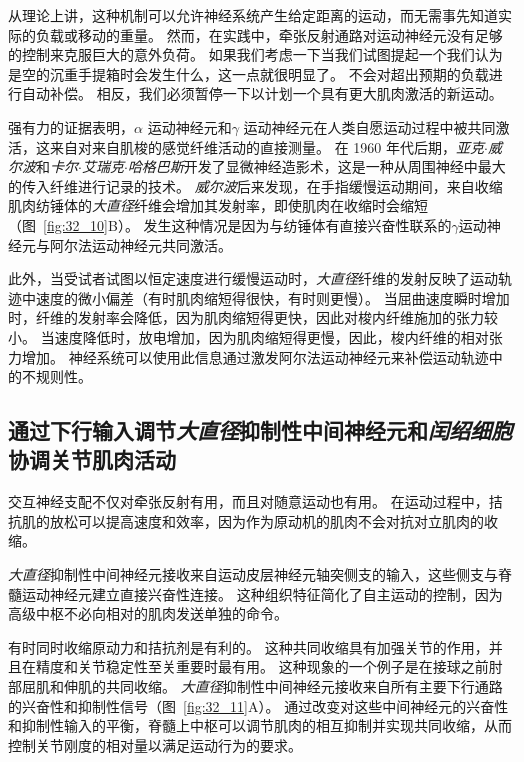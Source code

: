 从理论上讲，这种机制可以允许神经系统产生给定距离的运动，而无需事先知道实际的负载或移动的重量。
然而，在实践中，牵张反射通路对运动神经元没有足够的控制来克服巨大的意外负荷。
如果我们考虑一下当我们试图提起一个我们认为是空的沉重手提箱时会发生什么，这一点就很明显了。
不会对超出预期的负载进行自动补偿。
相反，我们必须暂停一下以计划一个具有更大肌肉激活的新运动。


强有力的证据表明，$ \alpha $ 运动神经元和$ \gamma $ 运动神经元在人类自愿运动过程中被共同激活，这来自对来自肌梭的感觉纤维活动的直接测量。
在 1960 年代后期，\textit{亚克$\cdot$威尔波}和\textit{卡尔$\cdot$艾瑞克$\cdot$哈格巴斯}开发了显微神经造影术，这是一种从周围神经中最大的传入纤维进行记录的技术。
\textit{威尔波}后来发现，在手指缓慢运动期间，来自收缩肌肉纺锤体的\textit{大直径}纤维会增加其发射率，即使肌肉在收缩时会缩短（图~\ref{fig:32_10}B）。
发生这种情况是因为与纺锤体有直接兴奋性联系的$ \gamma $运动神经元与阿尔法运动神经元共同激活。


此外，当受试者试图以恒定速度进行缓慢运动时，\textit{大直径}纤维的发射反映了运动轨迹中速度的微小偏差（有时肌肉缩短得很快，有时则更慢）。
当屈曲速度瞬时增加时，纤维的发射率会降低，因为肌肉缩短得更快，因此对梭内纤维施加的张力较小。
当速度降低时，放电增加，因为肌肉缩短得更慢，因此，梭内纤维的相对张力增加。
神经系统可以使用此信息通过激发阿尔法运动神经元来补偿运动轨迹中的不规则性。



\subsection{通过下行输入调节\textit{大直径}抑制性中间神经元和\textit{闰绍细胞}协调关节肌肉活动}

交互神经支配不仅对牵张反射有用，而且对随意运动也有用。
在运动过程中，拮抗肌的放松可以提高速度和效率，因为作为原动机的肌肉不会对抗对立肌肉的收缩。


\textit{大直径}抑制性中间神经元接收来自运动皮层神经元轴突侧支的输入，这些侧支与脊髓运动神经元建立直接兴奋性连接。
这种组织特征简化了自主运动的控制，因为高级中枢不必向相对的肌肉发送单独的命令。


有时同时收缩原动力和拮抗剂是有利的。
这种共同收缩具有加强关节的作用，并且在精度和关节稳定性至关重要时最有用。
这种现象的一个例子是在接球之前肘部屈肌和伸肌的共同收缩。
\textit{大直径}抑制性中间神经元接收来自所有主要下行通路的兴奋性和抑制性信号（图~\ref{fig:32_11}A）。
通过改变对这些中间神经元的兴奋性和抑制性输入的平衡，脊髓上中枢可以调节肌肉的相互抑制并实现共同收缩，从而控制关节刚度的相对量以满足运动行为的要求。



